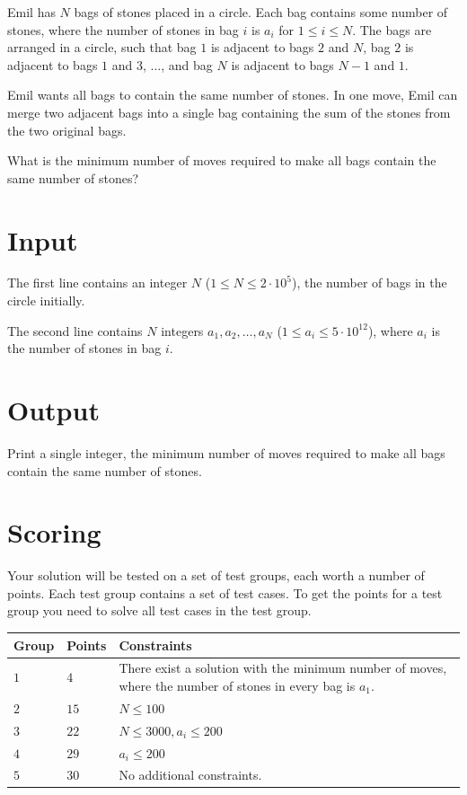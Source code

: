 \noindent

Emil has $N$ bags of stones placed in a circle.
Each bag contains some number of stones, where the number of stones in bag $i$ is $a_i$ for $1 \leq i \leq N$.
The bags are arranged in a circle, such that bag $1$ is adjacent to bags $2$ and $N$, bag $2$ is adjacent to bags $1$ and $3$, $\dots$, and bag $N$ is adjacent to bags $N-1$ and $1$.

Emil wants all bags to contain the same number of stones.
In one move, Emil can merge two adjacent bags into a single bag containing the sum of the stones from the two original bags.

What is the minimum number of moves required to make all bags contain the same number of stones?

\section*{Input}
The first line contains an integer $N$ ($1 \le N \le 2 \cdot 10^5$), the number of bags in the circle initially.

The second line contains $N$ integers $a_1, a_2, \ldots, a_N$ ($1 \le a_i \le 5 \cdot 10^{12}$), where $a_i$ is the number of stones in bag $i$.

\section*{Output}
Print a single integer, the minimum number of moves required to make all bags contain the same number of stones.


\section*{Scoring}
Your solution will be tested on a set of test groups, each worth a number of points. Each test group contains
a set of test cases. To get the points for a test group you need to solve all test cases in the test group.

\noindent
\begin{tabular}{| l | l | p{12cm} |}
  \hline
  \textbf{Group} & \textbf{Points} & \textbf{Constraints} \\ \hline
  $1$    & $4$        & There exist a solution with the minimum number of moves, where the number of stones in every bag is $a_1$. \\ \hline
  $2$    & $15$       & $N \le 100$ \\ \hline 
  $3$    & $22$       & $N \le 3000, a_i \le 200$ \\ \hline
  $4$    & $29$       & $a_i \le 200$ \\ \hline
  $5$    & $30$       & No additional constraints. \\ \hline 
\end{tabular}


